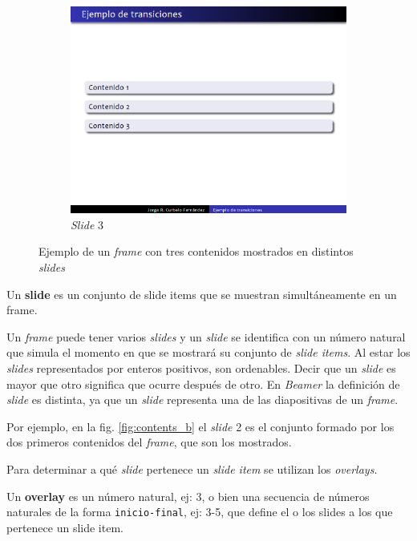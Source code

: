 \begin{figure}[tb]
\begin{subfigure}[b]{0.3\textwidth}
 				\includegraphics[width=\textwidth]{img/content3}
 				\caption{\textit{Slide} 3}
 				\label{fig:contents_c}	
 			\end{subfigure}	 			
 			\caption{Ejemplo de un \textit{frame} con tres contenidos mostrados en distintos \textit{slides}}
 			\label{fig:contents} 
 		\end{figure}

 		\begin{definition}
 		\label{def:slide}
 			Un \textnormal{\textbf{slide}} es un conjunto de \textnormal{slide items} que se muestran simultáneamente en un \textnormal{frame}.
 		\end{definition}
		
		Un \textit{frame} puede tener varios \textit{slides} y un \textit{slide} se identifica con un número natural que simula el momento en que se mostrará su conjunto de \textit{slide items}. Al estar los \textit{slides} representados por enteros positivos, son ordenables. Decir que un \textit{slide} es mayor que otro significa que ocurre después de otro. En \textit{Beamer} la definición de \textit{slide} es distinta, ya que un \textit{slide} representa una de las diapositivas de un \textit{frame}.

		Por ejemplo, en la fig. \ref{fig:contents_b} el \textit{slide} 2 es el conjunto formado por los dos primeros contenidos del \textit{frame}, que son los mostrados. 

		Para determinar a qué \textit{slide} pertenece un \textit{slide item} se utilizan los \textit{overlays}.				

 		\begin{definition}
 		\label{def:overlay}
 			Un \textnormal{\textbf{overlay}} es un número natural, ej: 3, o bien una secuencia de números naturales de la forma \texttt{inicio-final}, ej: 3-5, que define el o los \textnormal{slides} a los que pertenece un \textnormal{slide item}.
 		\end{definition}

